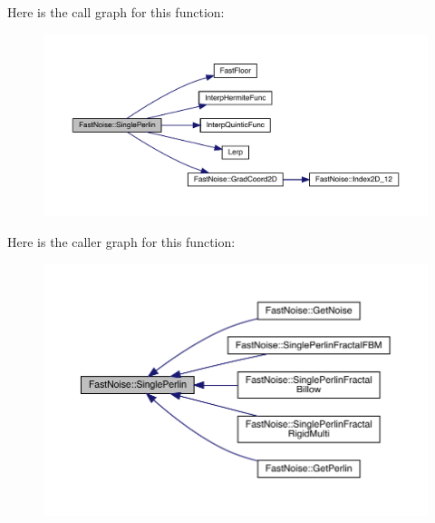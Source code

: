 Here is the call graph for this function\+:
\nopagebreak
\begin{figure}[H]
\begin{center}
\leavevmode
\includegraphics[width=350pt]{class_fast_noise_a2dd412856eb0d588fe8fbcb529517455_cgraph}
\end{center}
\end{figure}
Here is the caller graph for this function\+:
\nopagebreak
\begin{figure}[H]
\begin{center}
\leavevmode
\includegraphics[width=350pt]{class_fast_noise_a2dd412856eb0d588fe8fbcb529517455_icgraph}
\end{center}
\end{figure}
\mbox{\label{class_fast_noise_a93f68e6b4d364be7359076d5c7f19313}} 
